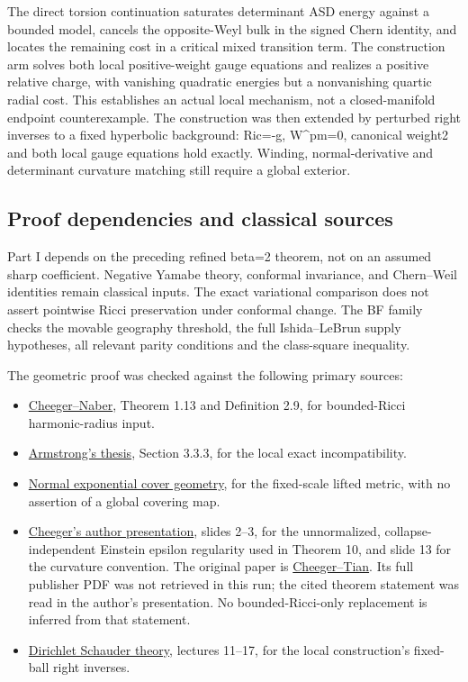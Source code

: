 \documentclass[
  10pt,
]{article}
\providecommand{\tightlist}{%
  \setlength{\itemsep}{0pt}\setlength{\parskip}{0pt}}
\begin{document}
The direct torsion continuation saturates determinant ASD energy against
a bounded model, cancels the opposite-Weyl bulk in the signed Chern
identity, and locates the remaining cost in a critical mixed transition
term. The construction arm solves both local positive-weight gauge
equations and realizes a positive relative charge, with vanishing
quadratic energies but a nonvanishing quartic radial cost. This
establishes an actual local mechanism, not a closed-manifold endpoint
counterexample. The construction was then extended by perturbed right
inverses to a fixed hyperbolic background: Ric=-g, W\^{}pm=0, canonical
weight2 and both local gauge equations hold exactly. Winding,
normal-derivative and determinant curvature matching still require a
global exterior.

\hypertarget{proof-dependencies-and-classical-sources}{%
\subsection{Proof dependencies and classical
sources}\label{proof-dependencies-and-classical-sources}}

Part I depends on the preceding refined beta=2 theorem, not on an
assumed sharp coefficient. Negative Yamabe theory, conformal invariance,
and Chern--Weil identities remain classical inputs. The exact
variational comparison does not assert pointwise Ricci preservation
under conformal change. The BF family checks the movable geography
threshold, the full Ishida--LeBrun supply hypotheses, all relevant
parity conditions and the class-square inequality.

The geometric proof was checked against the following primary sources:

\begin{itemize}
\tightlist
\item
  \href{https://arxiv.org/pdf/1406.6534}{Cheeger--Naber}, Theorem 1.13
  and Definition 2.9, for bounded-Ricci harmonic-radius input.
\item
  \href{https://johnarmstrongmaths.com/publications/resources/thesis.pdf}{Armstrong's
  thesis}, Section 3.3.3, for the local exact incompatibility.
\item
  \href{https://arxiv.org/html/2601.16176v1\#S2.SS3}{Normal exponential
  cover geometry}, for the fixed-scale lifted metric, with no assertion
  of a global covering map.
\item
  \href{https://sites.duke.edu/scshgap/files/2016/08/dim4dukebeamer.pdf}{Cheeger's
  author presentation}, slides 2--3, for the unnormalized,
  collapse-independent Einstein epsilon regularity used in Theorem 10,
  and slide 13 for the curvature convention. The original paper is
  \href{https://doi.org/10.1090/S0894-0347-05-00511-4}{Cheeger--Tian}.
  Its full publisher PDF was not retrieved in this run; the cited
  theorem statement was read in the author's presentation. No
  bounded-Ricci-only replacement is inferred from that statement.
\item
  \href{https://ocw.mit.edu/courses/18-156-differential-analysis-spring-2004/pages/lecture-notes/}{Dirichlet
  Schauder theory}, lectures 11--17, for the local construction's
  fixed-ball right inverses.
\end{itemize}
\end{document}
